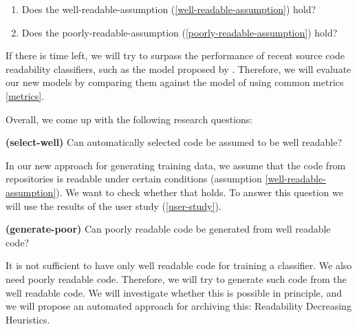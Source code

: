 \documentclass[%
class=scrreprt,
chapterprefix=false,%
open=right,%
twoside=false,%
paper=a4,%
logofile={Logo\_zentral\_farbig\_EN.png},%
thesistype=masterproposal,%
UKenglish,%
]{se2thesis}
\begin{document}
	\begin{enumerate}
		\item Does the well-readable-assumption (\ref{well-readable-assumption}) hold?
		\item Does the poorly-readable-assumption (\ref{poorly-readable-assumption}) hold?
	\end{enumerate}
	
	\label{suggestions} If there is time left, we will try to surpass the performance of recent source code readability classifiers, such as the model proposed by \citeauthor{mi2022towards} \cite{mi2022towards}. Therefore, we will evaluate our new models by comparing them against the model of \citeauthor{mi2022towards} using common metrics \ref{metrics}.
	
	Overall, we come up with the following research questions:
	
	
	
	\begin{resq} \textbf{(select-well)} Can automatically selected code be assumed to be well readable?\end{resq} \label{select-well}
	In our new approach for generating training data, we assume that the code from repositories is readable under certain conditions (assumption \ref{well-readable-assumption}). We want to check whether that holds. To answer this question we will use the results of the user study (\ref{user-study}).
	
	\begin{resq} \textbf{(generate-poor)} Can poorly readable code be generated from well readable code?\end{resq} \label{generate-poor}
	It is not sufficient to have only well readable code for training a classifier. We also need poorly readable code. Therefore, we will try to generate such code from the well readable code. We will investigate whether this is possible in principle, and we will propose an automated approach for archiving this: Readability Decreasing Heuristics.
	
\end{document}
